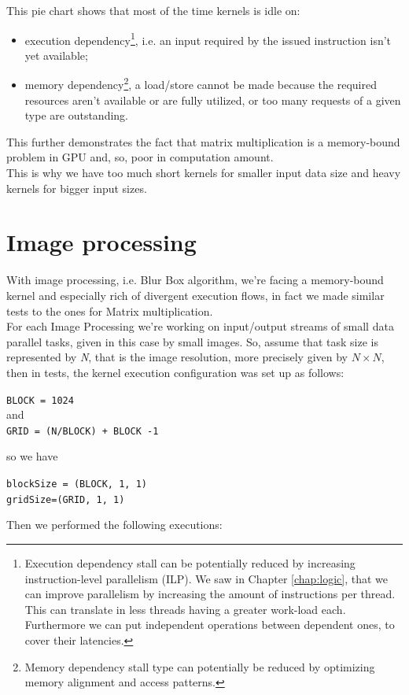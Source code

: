 This pie chart shows that most of the time kernels is idle on:
\begin{itemize}
	\item execution dependency\footnote{Execution dependency stall can be potentially reduced by increasing instruction-level parallelism (ILP). We saw in Chapter \ref{chap:logic}, that we can improve parallelism by increasing the amount of instructions per thread. This can translate in less threads having a greater work-load each. Furthermore we can put independent operations between dependent ones, to cover their latencies.}, i.e. an input required by the issued instruction isn't yet available; 
	
	\item memory dependency\footnote{ Memory dependency stall type can potentially be reduced by optimizing memory alignment and access patterns.}, a load/store cannot be made because the required resources aren't available or are fully utilized, or too many requests of a given type are outstanding.
\end{itemize}
This further demonstrates the fact that matrix multiplication is a memory-bound problem in GPU and, so, poor in computation amount.\\
This is why we have too much short kernels for smaller input data size and heavy kernels for bigger input sizes.


\section{Image processing}
With image processing, i.e. Blur Box algorithm, we're facing a memory-bound kernel and especially rich of divergent execution flows, in fact we made similar tests to the ones for Matrix multiplication.\\
For each Image Processing we're working on input/output streams of small data parallel tasks, given in this case by small images.
So, assume that task size is represented by \textit{N}, that is the image resolution, more precisely given by \(N\times N\), then
in tests, the kernel execution configuration was set up as follows:
\begin{center}	
 \texttt{BLOCK = 1024}\\ and\\
\texttt{GRID = (N/BLOCK) + BLOCK -1}
\end{center}
 so we have
\begin{center}	
	\texttt{blockSize = (BLOCK, 1, 1)}\\
	\texttt{gridSize=(GRID, 1, 1)}
\end{center}
Then we performed the following executions:


